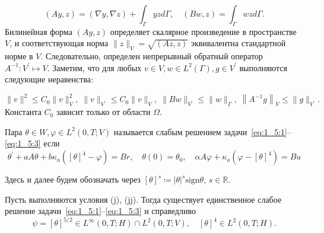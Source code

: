 \[
    (A y, z)=(\nabla y, \nabla z)+\int_{\Gamma} y z d \Gamma, \quad(B w, z)=\int_{\Gamma} w z d \Gamma.
\]
Билинейная форма $(A y, z)$ определяет скалярное произведение в пространстве $V$,
и соответствующая норма $\|z\|_{V}=\sqrt{(A z, z)}$ эквивалентна стандартной норме в $V$.
Следовательно, определен непрерывный обратный оператор
$A^{-1}: V^{\prime} \mapsto V$.
Заметим, что для любых $v \in V, w \in L^{2}(\Gamma), g \in V^{\prime}$
выполняются следующие неравенства:

\[
    \|v\|^{2} \leq C_{0}\|v\|_{V}^{2}, \; \|v\|_{V^{\prime}} \leq C_{0}\|v\|_{V}, \;
    \|B w\|_{V^{\prime}} \leq\|w\|_{\Gamma}, \; \left\|A^{-1} g\right\|_{V} \leq\|g\|_{V^{\prime}}.
\]
Константа $C_0$ зависит только от области $\Omega$.

\begin{definition}
    Пара $\theta \in W, \varphi \in L^{2}(0, T ; V)$
    называется слабым решением задачи~\eqref{eq:1_5:1}--\eqref{eq:1_5:3}
    если
    \begin{equation}
        \label{eq:1_5:weak}
        \theta^{\prime}+a A \theta+b \kappa_{a}\left([\theta]^{4}-\varphi\right)=B r,
        \quad \theta(0)=\theta_{0}, \quad \alpha A \varphi+\kappa_{a}\left(\varphi-[\theta]^{4}\right)=B u
    \end{equation}
\end{definition}
Здесь и далее будем обозначать через
$[\theta]^s \coloneqq |\theta|^s \mathrm{sign}\theta,\,s  \in \mathbb{R}$.
\begin{lemma}
    \label{lm:1_5:1}
    Пусть выполняются условия (j), (jj).
    Тогда существует единственное слабое решение задачи~\eqref{eq:1_5:1}--\eqref{eq:1_5:3} и справедливо
    \[
        \psi=[\theta]^{5 / 2} \in L^{\infty}(0, T ; H) \cap L^{2}(0, T ; V),
        \quad[\theta]^{4} \in L^{2}(0, T ; H).
    \]
\end{lemma}

